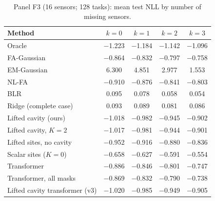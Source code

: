 \begin{table}[h]
\centering\small
\caption{\label{tab:moreF3}Panel F3 (16 sensors; 128 tasks): mean test NLL by number of missing sensors.}
\begin{tabular}{lcccc}
\toprule
Method & $k{=}0$ & $k{=}1$ & $k{=}2$ & $k{=}3$\\
\midrule
Oracle & $-$1.223 & $-$1.184 & $-$1.142 & $-$1.096\\
FA-Gaussian & $-$0.864 & $-$0.832 & $-$0.797 & $-$0.758\\
EM-Gaussian & 6.300 & 4.851 & 2.977 & 1.553\\
NL-FA & $-$0.910 & $-$0.876 & $-$0.841 & $-$0.803\\
BLR & 0.095 & 0.078 & 0.058 & 0.054\\
Ridge (complete case) & 0.093 & 0.089 & 0.081 & 0.086\\
Lifted cavity (ours) & $-$1.018 & $-$0.982 & $-$0.945 & $-$0.902\\
Lifted cavity, $K=2$ & $-$1.017 & $-$0.981 & $-$0.944 & $-$0.901\\
Lifted sites, no cavity & $-$0.952 & $-$0.916 & $-$0.880 & $-$0.836\\
Scalar sites ($K=0$) & $-$0.658 & $-$0.627 & $-$0.591 & $-$0.554\\
Transformer & $-$0.886 & $-$0.846 & $-$0.801 & $-$0.747\\
Transformer, all masks & $-$0.869 & $-$0.832 & $-$0.790 & $-$0.738\\
Lifted cavity transformer (v3) & $-$1.020 & $-$0.985 & $-$0.949 & $-$0.905\\
\bottomrule
\end{tabular}
\end{table}

